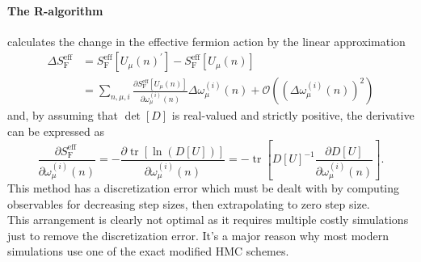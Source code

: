 \documentclass[a4paper,10pt]{book}
\begin{document}
\paragraph{The R-algorithm}\cite{PhysRevD.35.2531} calculates the change in the effective fermion action by the linear approximation 
\begin{equation}
\begin{aligned}
\Delta S_{\mathrm{F}}^{\mathrm{eff}} &=S_{\mathrm{F}}^{\mathrm{eff}}\left[U_{\mu}(n)^{\prime}\right]-S_{\mathrm{F}}^{\mathrm{eff}}\left[U_{\mu}(n)\right] \\
&=\sum_{n, \mu, i} \frac{\partial S_{\mathrm{F}}^{\mathrm{eff}}\left[U_{\mu}(n)\right]}{\partial \omega_{\mu}^{(i)}(n)} \Delta \omega_{\mu}^{(i)}(n)+\mathcal{O}\left(\left(\Delta \omega_{\mu}^{(i)}(n)\right)^{2}\right)
\end{aligned}
\end{equation}
and, by assuming that $\operatorname{det}[D]$ is real-valued and strictly positive, the derivative can be expressed as
\begin{equation}
\frac{\partial S_{\mathrm{F}}^{\text {eff }}}{\partial \omega_{\mu}^{(i)}(n)}=-\frac{\partial \operatorname{tr}[\ln (D[U])]}{\partial \omega_{\mu}^{(i)}(n)}=-\operatorname{tr}\left[D[U]^{-1} \frac{\partial D[U]}{\partial \omega_{\mu}^{(i)}(n)}\right].
\end{equation} 
This method has a discretization error which must be dealt with by computing observables for decreasing step sizes, then extrapolating to zero step size.\\This arrangement is clearly not optimal as it requires multiple costly simulations just to remove the discretization error. It's a major reason why most modern simulations use one of the exact modified HMC schemes.
\end{document}
